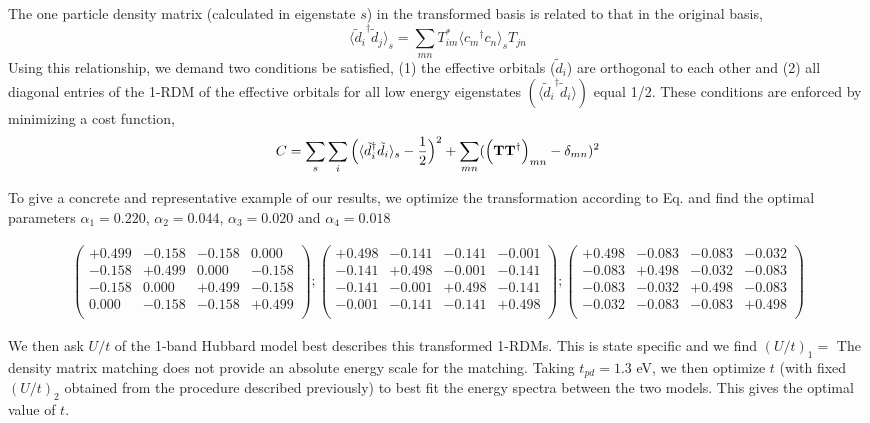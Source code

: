 The one particle density matrix (calculated in eigenstate $s$) 
in the transformed basis is related to that in the original basis,
\begin{equation}
	\langle {\tilde{d}_i}^{\dagger} \tilde{d}_{j} \rangle_{s} = \sum_{mn} T^{*}_{im} \langle {c_m}^{\dagger} c_n \rangle_{s} T_{jn}
\end{equation}
Using this relationship, we demand two conditions be satisfied, (1) the effective orbitals ($\tilde{d}_i$) are orthogonal to each other 
and (2) all diagonal entries of the 1-RDM of the effective orbitals for all low energy eigenstates $(\langle {\tilde{d}_i}^{\dagger} \tilde{d}_{i} \rangle)$ equal 1/2. These conditions are enforced by minimizing a cost function,
\begin{equation}
	C = \sum_{s} \sum_{i} \Big( \langle {\tilde{d}_i}^{\dagger} \tilde{d}_{i} \rangle_{s} - \frac{1}{2} \Big)^{2} + \sum_{mn} ( \Big({\bf T} {\bf T}^{\dagger}\Big)_{mn} -\delta_{mn})^{2}
\end{equation} 

To give a concrete and representative example of our results, we optimize the transformation 
according to Eq. and find the optimal parameters $\alpha_1=0.220$, $\alpha_2=0.044$, $\alpha_3=0.020$ 
and $\alpha_4=0.018$ 
\begin{small}
\begin{eqnarray}
\left(
\begin{array}{cccc}
+0.499 & -0.158 & -0.158 & 0.000  \\
-0.158 & +0.499 &  0.000 & -0.158 \\
-0.158 &  0.000 & +0.499 & -0.158 \\
 0.000 & -0.158 & -0.158 & +0.499 \\
\end{array}
\right);
\left(
\begin{array}{cccc}
+0.498 & -0.141 & -0.141 & -0.001  \\
-0.141 & +0.498 & -0.001 & -0.141 \\
-0.141 & -0.001 & +0.498 & -0.141 \\
-0.001 & -0.141 & -0.141 & +0.498 \\
\end{array}
\right)
;\left(
\begin{array}{cccc}
+0.498 & -0.083 & -0.083 & -0.032  \\
-0.083 & +0.498 & -0.032 & -0.083 \\
-0.083 & -0.032 & +0.498 & -0.083 \\
-0.032 & -0.083 & -0.083 & +0.498 \\
\end{array}
\right)
\end{eqnarray}
\end{small}
We then ask $U/t$ of the 1-band Hubbard model best describes this transformed 
1-RDMs. This is state specific and we find $(U/t)_1 = $ 
The density matrix matching does not provide an absolute energy scale for the matching. 
Taking $t_{pd} = 1.3$ eV, we then optimize $t$ (with fixed $(U/t)_2$ obtained from the procedure described 
previously) to best fit the energy spectra between the two models. This gives the optimal value of 
$t$. 



